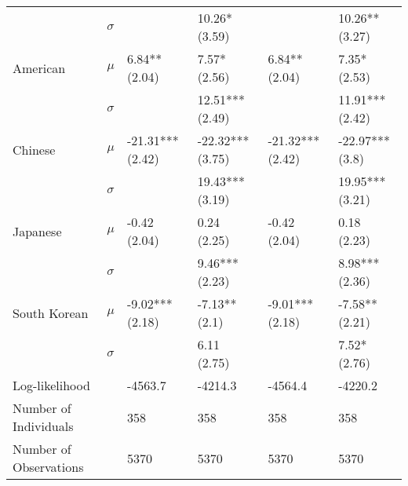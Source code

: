 \begin{tabular}{llllll}
                          &  $\sigma$ &                               &                 10.26* (3.59) &                                &                 10.26** (3.27) \\
                 American &     $\mu$ &                 6.84** (2.04) &                  7.57* (2.56) &                  6.84** (2.04) &                   7.35* (2.53) \\
                          &  $\sigma$ &                               &               12.51*** (2.49) &                                &                11.91*** (2.42) \\
                  Chinese &     $\mu$ &              -21.31*** (2.42) &              -22.32*** (3.75) &               -21.32*** (2.42) &                -22.97*** (3.8) \\
                          &  $\sigma$ &                               &               19.43*** (3.19) &                                &                19.95*** (3.21) \\
                 Japanese &     $\mu$ &                  -0.42 (2.04) &                   0.24 (2.25) &                   -0.42 (2.04) &                    0.18 (2.23) \\
                          &  $\sigma$ &                               &                9.46*** (2.23) &                                &                 8.98*** (2.36) \\
             South Korean &     $\mu$ &               -9.02*** (2.18) &                 -7.13** (2.1) &                -9.01*** (2.18) &                 -7.58** (2.21) \\
                          &  $\sigma$ &                               &                   6.11 (2.75) &                                &                   7.52* (2.76) \\
    \hline Log-likelihood &           &                       -4563.7 &                       -4214.3 &                        -4564.4 &                        -4220.2 \\
    Number of Individuals &           &                           358 &                           358 &                            358 &                            358 \\
   Number of Observations &           &                          5370 &                          5370 &                           5370 &                           5370 \\
\bottomrule
\end{tabular}
